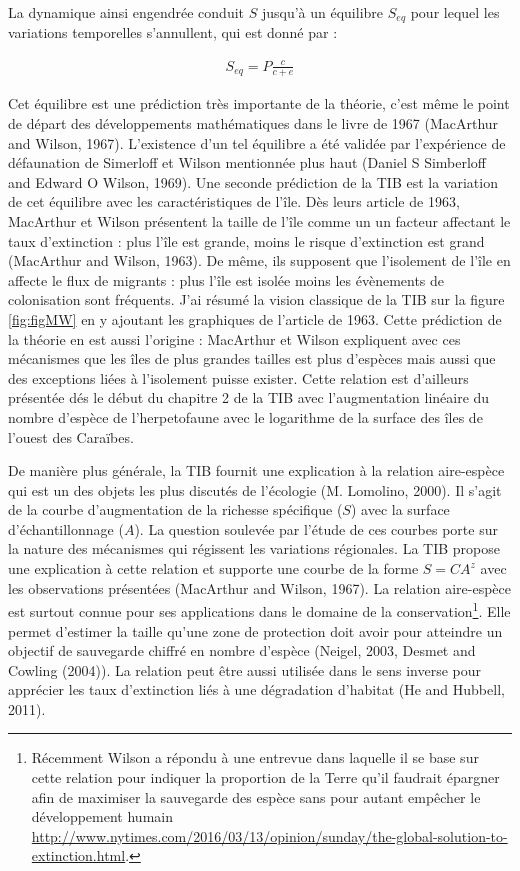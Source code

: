 La dynamique ainsi engendrée conduit \(S\) jusqu'à un équilibre
\(S_{eq}\) pour lequel les variations temporelles s'annullent, qui est
donné par :

\begin{eqnarray}
S_{eq} = P \frac{c}{c+e}
\end{eqnarray}

Cet équilibre est une prédiction très importante de la théorie, c'est
même le point de départ des développements mathématiques dans le livre
de 1967 (MacArthur and Wilson, 1967). L'existence d'un tel équilibre a
été validée par l'expérience de défaunation de Simerloff et Wilson
mentionnée plus haut (Daniel S Simberloff and Edward O Wilson, 1969).
Une seconde prédiction de la TIB est la variation de cet équilibre avec
les caractéristiques de l'île. Dès leurs article de 1963, MacArthur et
Wilson présentent la taille de l'île comme un un facteur affectant le
taux d'extinction : plus l'île est grande, moins le risque d'extinction
est grand (MacArthur and Wilson, 1963). De même, ils supposent que
l'isolement de l'île en affecte le flux de migrants : plus l'île est
isolée moins les évènements de colonisation sont fréquents. J'ai résumé
la vision classique de la TIB sur la figure
\protect\renewcommand{\plusnamesingular}{fig.}\cref{fig:figMW} en y
ajoutant les graphiques de l'article de 1963. Cette prédiction de la
théorie en est aussi l'origine : MacArthur et Wilson expliquent avec ces
mécanismes que les îles de plus grandes tailles est plus d'espèces mais
aussi que des exceptions liées à l'isolement puisse exister. Cette
relation est d'ailleurs présentée dés le début du chapitre 2 de la TIB
avec l'augmentation linéaire du nombre d'espèce de l'herpetofaune avec
le logarithme de la surface des îles de l'ouest des Caraïbes.

De manière plus générale, la TIB fournit une explication à la relation
aire-espèce qui est un des objets les plus discutés de l'écologie (M.
Lomolino, 2000). Il s'agit de la courbe d'augmentation de la richesse
spécifique (\(S\)) avec la surface d'échantillonnage (\(A\)). La
question soulevée par l'étude de ces courbes porte sur la nature des
mécanismes qui régissent les variations régionales. La TIB propose une
explication à cette relation et supporte une courbe de la forme
\(S=CA^z\) avec les observations présentées (MacArthur and Wilson,
1967). La relation aire-espèce est surtout connue pour ses applications
dans le domaine de la conservation\footnote{Récemment Wilson a répondu à
  une entrevue dans laquelle il se base sur cette relation pour indiquer
  la proportion de la Terre qu'il faudrait épargner afin de maximiser la
  sauvegarde des espèce sans pour autant empêcher le développement
  humain
  \url{http://www.nytimes.com/2016/03/13/opinion/sunday/the-global-solution-to-extinction.html}.}.
Elle permet d'estimer la taille qu'une zone de protection doit avoir
pour atteindre un objectif de sauvegarde chiffré en nombre d'espèce
(Neigel, 2003, Desmet and Cowling (2004)). La relation peut être aussi
utilisée dans le sens inverse pour apprécier les taux d'extinction liés
à une dégradation d'habitat (He and Hubbell, 2011).


